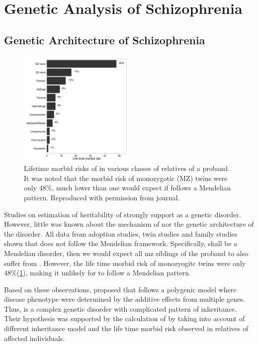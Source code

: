
	\section{Genetic Analysis of Schizophrenia}
	\subsection{Genetic Architecture of Schizophrenia}
	\begin{figure}
		\centering
		\includegraphics[width=0.5\textwidth]{figure/lifeTimeMorbidRisk.png}
		\caption[Lifetime morbid risks of  in various classes of relatives of a proband]{Lifetime morbid risks of  in various classes of relatives of a proband.
			It was noted that the morbid risk of monozygotic (MZ) twins were only $48\%$, much lower than one would expect if  follows a Mendelian pattern.
			Reproduced with permission from journal\citep{Riley2006}. \label{fig:lifeMRscz}}
	\end{figure}
	Studies on estimation of heritability of  strongly support  as a genetic disorder.
	However, little was known about the mechanism of  nor the genetic architecture of the disorder. 
	All data from adoption studies, twin studies and family studies shown that  does not follow the Mendelian framework\cite{Gottesman01071967,Gottesman1982}.
	Specifically, shall  be a Mendelian disorder, then we would expect all \gls{mz} siblings of the proband to also suffer from .
	However, the life time morbid risk of monozyogitc twins were only $48\%$(\cref{fig:lifeMRscz})\citep{gottesman1991schizophrenia}, making it unlikely for  to follow a Mendelian pattern.
	
	Based on these observations, \cite{Gottesman1967} proposed that  follows a polygenic model where disease phenotype were determined by the additive effects from multiple genes.
	Thus,  is a complex genetic disorder with complicated pattern of inheritance. 
	Their hypothesis was supported by the calculation of \cite{Risch1990a} by taking into account of different inheritance model and the life time morbid risk observed in relatives of affected individuals.
	

